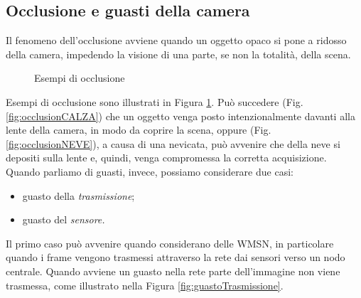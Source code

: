 \subsection{Occlusione e guasti della camera}
Il fenomeno dell'occlusione avviene quando un oggetto opaco si pone a ridosso della camera, impedendo la visione di una parte, se non la totalit\`a, della scena. 
\begin{figure}[tb]
	\centering
	\caption{Esempi di occlusione}
	\label{fig:occlusion}
\end{figure}
\noindent Esempi di occlusione sono illustrati in Figura \ref{fig:occlusion}. 
Pu\`o succedere (Fig. \ref{fig:occlusionCALZA}) che un oggetto venga posto intenzionalmente davanti alla lente della camera, in modo da coprire la scena, oppure (Fig. \ref{fig:occlusionNEVE}), a causa di una nevicata, pu\`o avvenire che della neve si depositi sulla lente e, quindi, venga compromessa la corretta acquisizione.\\
Quando parliamo di guasti, invece, possiamo considerare due casi:
\begin{itemize}
	\item guasto della \textit{trasmissione};
	\item guasto del \textit{sensore.}
\end{itemize}
Il primo caso pu\`o avvenire quando considerano delle WMSN, in particolare quando i frame vengono trasmessi attraverso la rete dai sensori verso un nodo centrale.
Quando avviene un guasto nella rete parte dell'immagine non viene trasmessa, come illustrato nella Figura \ref{fig:guastoTrasmissione}.
